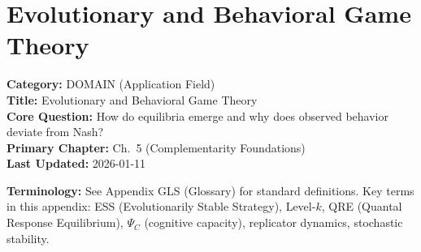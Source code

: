 \section{Evolutionary and Behavioral Game Theory}
\label{app:evolutionary-behavioral-gt}


\begin{tcolorbox}[colback=gray!5!white, colframe=gray!75!black,
    title=\textbf{Appendix: AD DOMAIN-EVGT}]
\textbf{Category:} DOMAIN (Application Field) \\
\textbf{Title:} Evolutionary and Behavioral Game Theory \\
\textbf{Core Question:} How do equilibria emerge and why does observed behavior deviate from Nash? \\
\textbf{Primary Chapter:} Ch.\ 5 (Complementarity Foundations) \\
\textbf{Last Updated:} 2026-01-11
\end{tcolorbox}

\begin{tcolorbox}[colback=gray!5!white, colframe=gray!50!black]
\textbf{Terminology:} See Appendix GLS (Glossary) for standard definitions.
Key terms in this appendix: ESS (Evolutionarily Stable Strategy), Level-$k$,
QRE (Quantal Response Equilibrium), $\Psi_C$ (cognitive capacity),
replicator dynamics, stochastic stability.
\end{tcolorbox}


